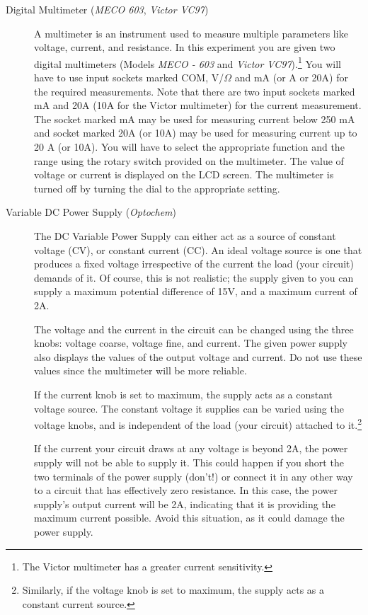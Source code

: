 \begin{description}
\item[Digital Multimeter (\textit{MECO 603}, \textit{Victor VC97})]

A multimeter is an instrument used to measure multiple parameters like voltage, current, and resistance. In this experiment you are given two digital multimeters (Models \textit{MECO - 603} and \textit{Victor VC97}).\footnote{The Victor multimeter has a greater current sensitivity.} You will have to use input sockets marked COM, V/$\Omega$ and mA (or A or 20A) for the required measurements. Note that there are two input sockets marked mA and 20A (10A for the Victor multimeter) for the current measurement. The socket marked mA may be used for measuring current below 250 mA and socket marked 20A (or 10A) may be used for measuring current up to 20 A (or 10A). You will have to select the appropriate function and the range using the rotary switch provided on the multimeter. The value of voltage or current is displayed on the LCD screen. The multimeter is turned off by turning the dial to the appropriate setting.

\item[Variable DC Power Supply (\textit{Optochem})]

The DC Variable Power Supply can either act as a source of constant voltage (CV), or constant current (CC). An ideal voltage source is one that produces a fixed voltage irrespective of the current the load (your circuit) demands of it. Of course, this is not realistic; the supply given to you can supply a maximum potential difference of 15V, and a maximum current of 2A.

The voltage and the current in the circuit can be changed using the three knobs: voltage coarse, voltage fine, and current. The given power supply also displays the values of the output voltage and current. Do not use these values since the multimeter will be more reliable. 

If the current knob is set to maximum, the supply acts as a constant voltage source. The constant voltage it supplies can be varied using the voltage knobs, and is independent of the load (your circuit) attached to it.\footnote{Similarly, if the voltage knob is set to maximum, the supply acts as a constant current source.}

\begin{imp}
If the current your circuit draws at any voltage is beyond 2A, the power supply will not be able to supply it. This could happen if you short the two terminals of the power supply (don't!) or connect it in any other way to a circuit that has effectively zero resistance. In this case, the power supply's output current will be 2A, indicating that it is providing the maximum current possible. Avoid this situation, as it could damage the power supply.
\end{imp}


\end{description}
